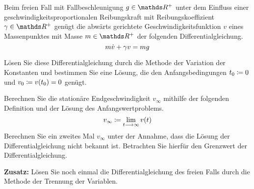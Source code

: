 \begin{atiTask}[
  title = Freier Fall mit Reibung
]
 Beim freien Fall mit Fallbeschleunigung $g\in\setR^+$ unter dem Einfluss einer geschwindigkeitsproportionalen Reibungskraft mit Reibungskoeffizient $\gamma\in\setR^+$ genügt die abwärts gerichtete Geschwindigkeitsfunktion $v$ eines Massenpunktes mit Masse $m\in\setR^+$ der folgenden Differentialgleichung.
 \[
   m\dot{v} + \gamma v = mg
 \]
 \begin{atiSubtasks}
   \item{
    Lösen Sie diese Differentialgleichung durch die Methode der Variation der Konstanten und bestimmen Sie eine Lösung, die den Anfangsbedingungen $t_0\coloneqq 0$ und $v_0\coloneqq v(t_0)=0$ genügt.
  }
  \item{
    Berechnen Sie die stationäre Endgeschwindigkeit $v_\infty$ mithilfe der folgenden Definition und der Lösung des Anfangswertproblems.
    \[
      v_\infty \define \lim_{t\conv\infty}v(t)
    \]
    Berechnen Sie ein zweites Mal $v_\infty$ unter der Annahme, dass die Lösung der Differentialgleichung nicht bekannt ist.
    Betrachten Sie hierfür den Grenzwert der Differentialgleichung.
  }
  \item{
    \textbf{Zusatz:}
    Lösen Sie noch einmal die Differentialgleichung des freien Falls durch die Methode der Trennung der Variablen.
  }
 \end{atiSubtasks}
\end{atiTask}
